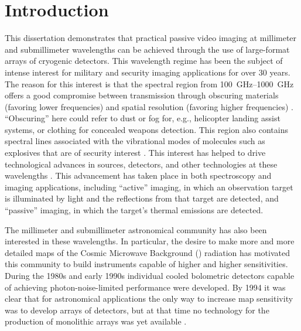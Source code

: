 \chapter{Introduction} \label{c:intro}



This dissertation demonstrates that practical passive video imaging at millimeter and submillimeter wavelengths can be achieved through the use of large-format arrays of cryogenic detectors.
This wavelength regime has been the subject of intense interest for military and security imaging applications for over 30 years.
The reason for this interest is that the spectral region from \SIrange{100}{1000}{\GHz} offers a good compromise between transmission through obscuring materials (favoring lower frequencies) and spatial resolution (favoring higher frequencies) \cite{kruse_why_1981}.
``Obscuring'' here could refer to dust or fog for, e.g., helicopter landing assist systems, or clothing for concealed weapons detection.
This region also contains spectral lines associated with the vibrational modes of molecules such as explosives that are of security interest \cite{federici_thz_2005,davies_terahertz_2008}.
This interest has helped to drive technological advances in sources, detectors, and other technologies at these wavelengths \cite{popovic_thz_2011,rogalski_terahertz_2011,rieke_detection_2003}.
This advancement has taken place in both spectroscopy and imaging applications, including ``active'' imaging, in which an observation target is illuminated by light and the reflections from that target are detected, and ``passive'' imaging, in which the target's thermal emissions are detected.

The millimeter and submillimeter astronomical community has also been interested in these wavelengths.
In particular, the desire to make more and more detailed maps of the Cosmic Microwave Background (\CMB) radiation has motivated this community to build instruments capable of higher and higher sensitivities.
During the 1980s and early 1990s individual cooled bolometric detectors capable of achieving photon-noise-limited performance were developed.
By 1994 it was clear that for astronomical applications the only way to increase map sensitivity was to develop arrays of detectors, but at that time no technology for the production of monolithic arrays was yet available \cite{richards_bolometers_1994}.

